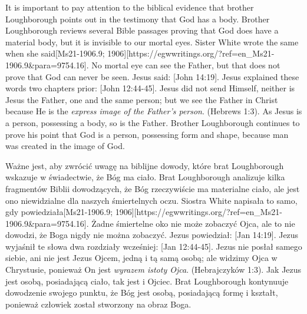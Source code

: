 It is important to pay attention to the biblical evidence that brother Loughborough points out in the testimony that God has a body. Brother Loughborough reviews several Bible passages proving that God does have a material body, but it is invisible to our mortal eyes. Sister White wrote the same when she said[Ms21-1906.9; 1906][https://egwwritings.org/?ref=en\_Ms21-1906.9&para=9754.16]. No mortal eye can see the Father, but that does not prove that God can never be seen. Jesus said: [John 14:19]. Jesus explained these words two chapters prior: [John 12:44-45]. Jesus did not send Himself, neither is Jesus the Father, one and the same person; but we see the Father in Christ because He is the \textit{express image of the Father's person}. (Hebrews 1:3). As Jesus is a person, possessing a body, so is the Father. Brother Loughborough continues to prove his point that God is a person, possessing form and shape, because man was created in the image of God.


Ważne jest, aby zwrócić uwagę na biblijne dowody, które brat Loughborough wskazuje w świadectwie, że Bóg ma ciało. Brat Loughborough analizuje kilka fragmentów Biblii dowodzących, że Bóg rzeczywiście ma materialne ciało, ale jest ono niewidzialne dla naszych śmiertelnych oczu. Siostra White napisała to samo, gdy powiedziała[Ms21-1906.9; 1906][https://egwwritings.org/?ref=en\_Ms21-1906.9&para=9754.16]. Żadne śmiertelne oko nie może zobaczyć Ojca, ale to nie dowodzi, że Boga nigdy nie można zobaczyć. Jezus powiedział: [Jan 14:19]. Jezus wyjaśnił te słowa dwa rozdziały wcześniej: [Jan 12:44-45]. Jezus nie posłał samego siebie, ani nie jest Jezus Ojcem, jedną i tą samą osobą; ale widzimy Ojca w Chrystusie, ponieważ On jest \textit{wyrazem istoty Ojca}. (Hebrajczyków 1:3). Jak Jezus jest osobą, posiadającą ciało, tak jest i Ojciec. Brat Loughborough kontynuuje dowodzenie swojego punktu, że Bóg jest osobą, posiadającą formę i kształt, ponieważ człowiek został stworzony na obraz Boga.


